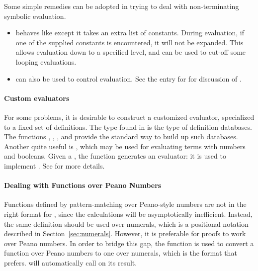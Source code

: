 Some simple remedies can be adopted in trying to deal with
non-terminating symbolic evaluation.
\begin{itemize}
\item {} behaves like  except
  it takes an extra list of constants. During
  evaluation, if one of the supplied constants is encountered, it will
  not be expanded. This allows evaluation down to a specified level,
  and can be used to cut-off some looping evaluations.
\item {} can also be used to control
 evaluation. See the \REFERENCE{} entry for  for
 discussion of .

\end{itemize}

\paragraph{Custom evaluators}

For some problems, it is desirable to construct a customized
evaluator, specialized to a fixed set of definitions. The 
type found in  is the type of definition databases. The
functions , , , and
 provide the standard way to build up such
databases. Another quite useful  is
, which may be used for evaluating
terms with numbers and booleans.  Given a , the function
 generates an evaluator: it is used to implement .
See \REFERENCE{} for more details.

\paragraph{Dealing with Functions over Peano Numbers}

Functions defined by pattern-matching over Peano-style numbers are not
in the right format for , since the calculations will be
asymptotically inefficient. Instead, the same definition should be
used over numerals, which is a positional notation described in
Section~\ref{sec:numerals}. However, it is preferable for proofs to
work over Peano numbers. In order to bridge this gap, the function
 is used to convert a function
over Peano numbers to one over numerals, which is the format that
 prefers.  will automatically call
 on its result.

